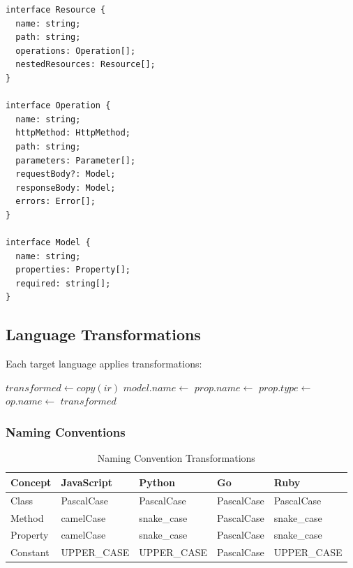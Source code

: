 \begin{lstlisting}[caption=IR Structure]
interface Resource {
  name: string;
  path: string;
  operations: Operation[];
  nestedResources: Resource[];
}

interface Operation {
  name: string;
  httpMethod: HttpMethod;
  path: string;
  parameters: Parameter[];
  requestBody?: Model;
  responseBody: Model;
  errors: Error[];
}

interface Model {
  name: string;
  properties: Property[];
  required: string[];
}
\end{lstlisting}

\subsection{Language Transformations}

Each target language applies transformations:

\begin{algorithm}
\caption{Language-Specific Transformation}
\begin{algorithmic}[1]
    \State $transformed \gets copy(ir)$
        \State $model.name \gets$ 
            \State $prop.name \gets$ 
            \State $prop.type \gets$ 
        \EndFor
    \EndFor
            \State $op.name \gets$ 
        \EndFor
    \EndFor
    \State \Return $transformed$
\EndFunction
\end{algorithmic}
\end{algorithm}

\subsubsection{Naming Conventions}

\begin{table}[h]
\centering
\caption{Naming Convention Transformations}
\begin{tabular}{lllll}
\toprule
\textbf{Concept} & \textbf{JavaScript} & \textbf{Python} & \textbf{Go} & \textbf{Ruby} \\
\midrule
Class & PascalCase & PascalCase & PascalCase & PascalCase \\
Method & camelCase & snake\_case & PascalCase & snake\_case \\
Property & camelCase & snake\_case & PascalCase & snake\_case \\
Constant & UPPER\_CASE & UPPER\_CASE & PascalCase & UPPER\_CASE \\
\bottomrule
\end{tabular}
\end{table}

